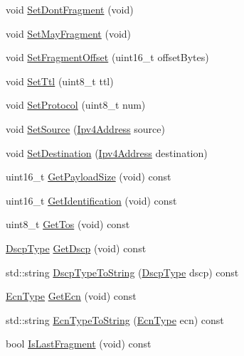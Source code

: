 \begin{DoxyCompactItemize}
void \hyperlink{classns3_1_1Ipv4Header_a80a692a642e7c9f882f06fbb6803755f}{Set\+Dont\+Fragment} (void)
\item 
void \hyperlink{classns3_1_1Ipv4Header_a7297ae27278f905cd38d6ca4ff2d13d3}{Set\+May\+Fragment} (void)
\item 
void \hyperlink{classns3_1_1Ipv4Header_ad255b34cb91d7eb727927d04016a5536}{Set\+Fragment\+Offset} (uint16\+\_\+t offset\+Bytes)
\item 
void \hyperlink{classns3_1_1Ipv4Header_a5d244d173e0921a99276ff5f5825b28b}{Set\+Ttl} (uint8\+\_\+t ttl)
\item 
void \hyperlink{classns3_1_1Ipv4Header_aca424df8132b7717fb4c315fcb4ce4bf}{Set\+Protocol} (uint8\+\_\+t num)
\item 
void \hyperlink{classns3_1_1Ipv4Header_af3c8c140e302ec4aa1dc885ce1dcc070}{Set\+Source} (\hyperlink{classns3_1_1Ipv4Address}{Ipv4\+Address} source)
\item 
void \hyperlink{classns3_1_1Ipv4Header_a154e584fb5418de7a5ce34dbb852de02}{Set\+Destination} (\hyperlink{classns3_1_1Ipv4Address}{Ipv4\+Address} destination)
\item 
uint16\+\_\+t \hyperlink{classns3_1_1Ipv4Header_a3a2ddc8c8a5f91128deb44372c2371eb}{Get\+Payload\+Size} (void) const 
\item 
uint16\+\_\+t \hyperlink{classns3_1_1Ipv4Header_a00a13506e5295b7da3c15b9085951bcb}{Get\+Identification} (void) const 
\item 
uint8\+\_\+t \hyperlink{classns3_1_1Ipv4Header_a381cd0f84a106436d49597ccdc3608a9}{Get\+Tos} (void) const 
\item 
\hyperlink{classns3_1_1Ipv4Header_aaa17802e7732a689311b72d48d1a3450}{Dscp\+Type} \hyperlink{classns3_1_1Ipv4Header_a60d238b9d5f491df4d7626382505b0fe}{Get\+Dscp} (void) const 
\item 
std\+::string \hyperlink{classns3_1_1Ipv4Header_a2498bae27aa88dd746d0e0c3ee52bcf8}{Dscp\+Type\+To\+String} (\hyperlink{classns3_1_1Ipv4Header_aaa17802e7732a689311b72d48d1a3450}{Dscp\+Type} dscp) const 
\item 
\hyperlink{classns3_1_1Ipv4Header_a9cec46635fa719f0d58234cf8805991b}{Ecn\+Type} \hyperlink{classns3_1_1Ipv4Header_ac5b818a97ed69188202d2c66ca7717c0}{Get\+Ecn} (void) const 
\item 
std\+::string \hyperlink{classns3_1_1Ipv4Header_a9b74598e71019dcb0add54df4e5a72d8}{Ecn\+Type\+To\+String} (\hyperlink{classns3_1_1Ipv4Header_a9cec46635fa719f0d58234cf8805991b}{Ecn\+Type} ecn) const 
\item 
bool \hyperlink{classns3_1_1Ipv4Header_a370ba37b31570417950cf13c62cd81a2}{Is\+Last\+Fragment} (void) const 

\end{DoxyCompactItemize}
